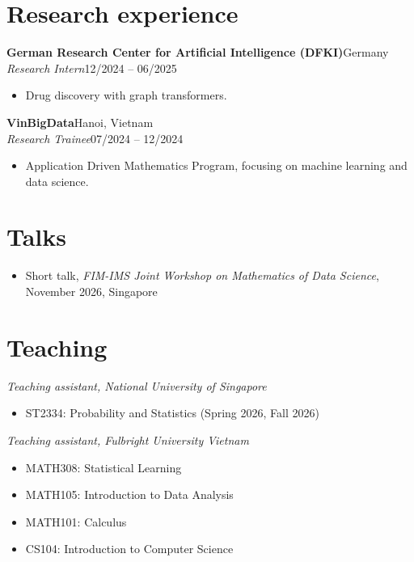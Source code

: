 \documentclass[11pt,a4paper]{article}
\newcommand{\entry}[4]{%
  \textbf{#1}\hfill #2\\
  #3\hfill #4\par
}
\newcommand{\entrygap}{\vspace{1.2ex}}
\begin{document}
\section{Research experience}
\entry{German Research Center for Artificial Intelligence (DFKI)}{Germany}
      {\textit{Research Intern}}{12/2024 -- 06/2025}
\begin{itemize}
  \item Drug discovery with graph transformers.
\end{itemize}
\entrygap

\entry{VinBigData}{Hanoi, Vietnam}
      {\textit{Research Trainee}}{07/2024 -- 12/2024}
\begin{itemize}
  \item Application Driven Mathematics Program, focusing on machine learning and data science.
\end{itemize}



\section{Talks}
\begin{itemize}
  \item Short talk, \textit{FIM-IMS Joint Workshop on Mathematics of Data Science}, November 2026, Singapore
\end{itemize}

\section{Teaching}
\textit{Teaching assistant, National University of Singapore}
\begin{itemize}
  \item ST2334: Probability and Statistics (Spring 2026, Fall 2026)
\end{itemize}
\vspace{1ex}

\textit{Teaching assistant, Fulbright University Vietnam}
\begin{itemize}
  \item MATH308: Statistical Learning
  \item MATH105: Introduction to Data Analysis
  \item MATH101: Calculus
  \item CS104: Introduction to Computer Science
\end{itemize}
\end{document}
